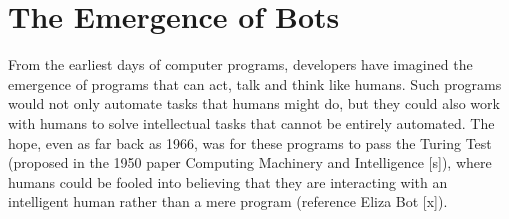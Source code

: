 \documentclass{sig-alternate}
\begin{document}
%
\author{
% 
%
\alignauthor
XXX\\
       \\
}

\date{29 Sept 2017}

\maketitle
%




\section{The Emergence of Bots} 

From the earliest days of computer programs, developers have imagined the emergence of programs that can act, talk and think like humans.
Such programs would not only automate tasks that humans might do, but they could also work with humans to solve intellectual tasks that cannot be entirely automated. 
The hope, even as far back as 1966, was for these programs to pass the Turing Test (proposed in the 1950 paper Computing Machinery and Intelligence [s]), where humans could be fooled into believing that they are interacting with an intelligent human rather than a mere program (reference Eliza Bot [x]). 
\end{document}
